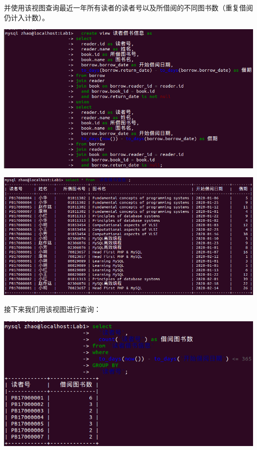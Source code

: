 \documentclass[UTF8,zihao=-4]{ctexart}
\begin{document}
\begin{enumerate}
		并使用该视图查询最近一年所有读者的读者号以及所借阅的不同图书数（重复借阅仍计入计数）。 
		\begin{center}
			\includegraphics[width=\linewidth]{3-9-1.png}

			\includegraphics[width=\linewidth]{3-9-2.png}
		\end{center} 
		接下来我们用该视图进行查询：
		\begin{center}
			\includegraphics[width=\linewidth]{3-9-3.png}
		\end{center}
	\end{enumerate}
\end{document}
